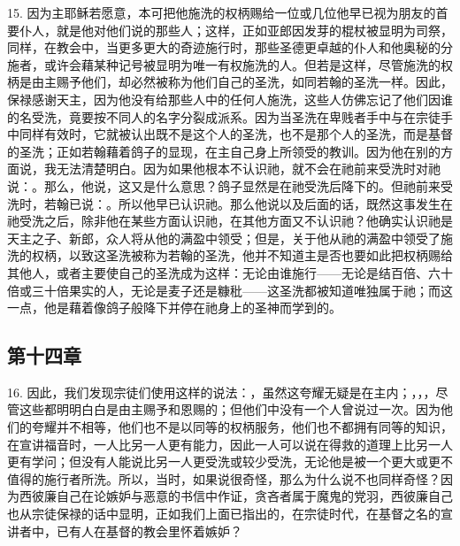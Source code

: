15. 因为主耶稣若愿意，本可把他施洗的权柄赐给一位或几位他早已视为朋友的首要仆人，就是他对他们说的那些人；这样，正如亚郎因发芽的棍杖被显明为司祭，同样，在教会中，当更多更大的奇迹施行时，那些圣德更卓越的仆人和他奥秘的分施者，或许会藉某种记号被显明为唯一有权施洗的人。但若是这样，尽管施洗的权柄是由主赐予他们，却必然被称为他们自己的圣洗，如同若翰的圣洗一样。因此，保禄感谢天主，因为他没有给那些人中的任何人施洗，这些人仿佛忘记了他们因谁的名受洗，竟要按不同人的名字分裂成派系。因为当圣洗在卑贱者手中与在宗徒手中同样有效时，它就被认出既不是这个人的圣洗，也不是那个人的圣洗，而是基督的圣洗；正如若翰藉着鸽子的显现，在主自己身上所领受的教训。因为他在别的方面说，我无法清楚明白。因为如果他根本不认识祂，就不会在祂前来受洗时对祂说：。那么，他说，这又是什么意思？鸽子显然是在祂受洗后降下的。但祂前来受洗时，若翰已说：。所以他早已认识祂。那么他说以及后面的话，既然这事发生在祂受洗之后，除非他在某些方面认识祂，在其他方面又不认识祂？他确实认识祂是天主之子、新郎，众人将从他的满盈中领受；但是，关于他从祂的满盈中领受了施洗的权柄，以致这圣洗被称为若翰的圣洗，他并不知道主是否也要如此把权柄赐给其他人，或者主要使自己的圣洗成为这样：无论由谁施行——无论是结百倍、六十倍或三十倍果实的人，无论是麦子还是糠秕——这圣洗都被知道唯独属于祂；而这一点，他是藉着像鸽子般降下并停在祂身上的圣神而学到的。\par


\subsection{第十四章}

16. 因此，我们发现宗徒们使用这样的说法：，虽然这夸耀无疑是在主内；，，，尽管这些都明明白白是由主赐予和恩赐的；但他们中没有一个人曾说过一次。因为他们的夸耀并不相等，他们也不是以同等的权柄服务，他们也不都拥有同等的知识，在宣讲福音时，一人比另一人更有能力，因此一人可以说在得救的道理上比另一人更有学问；但没有人能说比另一人更受洗或较少受洗，无论他是被一个更大或更不值得的施行者所洗。所以，当时，如果说很奇怪，那么为什么说不也同样奇怪？因为西彼廉自己在论嫉妒与恶意的书信中作证，贪吝者属于魔鬼的党羽，西彼廉自己也从宗徒保禄的话中显明，正如我们上面已指出的，在宗徒时代，在基督之名的宣讲者中，已有人在基督的教会里怀着嫉妒？\par

